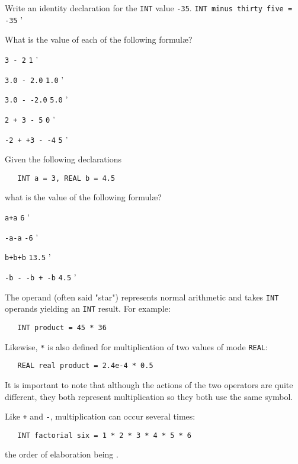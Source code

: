 \begin{exercise}
\item Write an identity declaration for the \verb|INT| value
\verb|-35|. \ans \verb|INT minus thirty five = -35|
'
\item What is the value of each of the following formul{\ae}?
\begin{subex}
\item \verb|3 - 2| \subans \verb|1|
'
\item \verb|3.0 - 2.0| \subans \verb|1.0|
'
\item \verb|3.0 - -2.0| \subans \verb|5.0|
'
\item \verb|2 + 3 - 5| \subans \verb|0|
'
\item \verb|-2 + +3 - -4| \subans \verb|5|
'
\end{subex}
\item Given the following declarations
\begin{verbatim}
   INT a = 3, REAL b = 4.5
\end{verbatim}
\noindent
what is the value of the following formul{\ae}?
\begin{subex}
\item \verb|a+a| \subans \verb|6|
'
\item \verb|-a-a| \subans \verb|-6|
'
\item \verb|b+b+b| \subans \verb|13.5|
'
\item \verb|-b - -b + -b| \subans \verb|4.5|
'
\end{subex}
\end{exercise}

The operand \ixtt{*} (often said "star") represents normal
arithmetic  and takes \verb|INT| operands yielding
an \verb|INT| result. For example:
\begin{verbatim}
   INT product = 45 * 36
\end{verbatim}
\noindent
Likewise, \verb|*| is also defined for multiplication of two values
of mode \verb|REAL|:
\begin{verbatim}
   REAL real product = 2.4e-4 * 0.5
\end{verbatim}
\noindent
It is important to note that although the actions of the two
operators are quite different, they both represent multiplication so
they both use the same symbol.

Like \verb|+| and \verb|-|, multiplication can occur several times:
\begin{verbatim}
   INT factorial six = 1 * 2 * 3 * 4 * 5 * 6
\end{verbatim}
\noindent
the order of elaboration being
.

